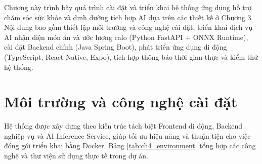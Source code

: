 \documentclass[../main.tex]{subfiles}
\begin{document}
Chương này trình bày quá trình cài đặt và triển khai hệ thống ứng dụng hỗ trợ chăm sóc sức khỏe và dinh dưỡng tích hợp AI dựa trên các thiết kế ở Chương 3. Nội dung bao gồm thiết lập môi trường và công nghệ cài đặt, triển khai dịch vụ AI nhận diện món ăn và ước lượng calo (Python FastAPI + ONNX Runtime), cài đặt Backend chính (Java Spring Boot), phát triển ứng dụng di động (TypeScript, React Native, Expo), tích hợp thông báo thời gian thực và kiểm thử hệ thống.

\section{Môi trường và công nghệ cài đặt}
\label{sec:4.1}

Hệ thống được xây dựng theo kiến trúc tách biệt Frontend di động, Backend nghiệp vụ và AI Inference Service, giúp tối ưu hiệu năng và thuận tiện cho việc đóng gói triển khai bằng Docker. Bảng \ref{tab:ch4_environment} tổng hợp các công nghệ và thư viện sử dụng thực tế trong dự án.
\end{document}
